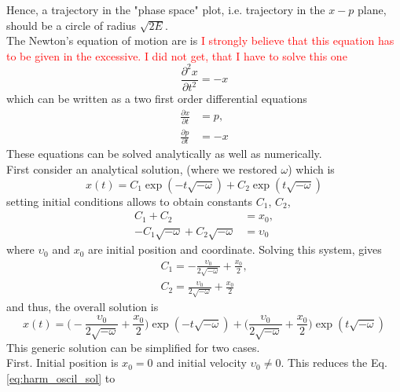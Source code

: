 \documentclass{article}
\begin{document}
Hence, a trajectory in the "phase space" plot, i.e. trajectory in the $x-p$ plane, should be a circle of radius $\sqrt{2E}$.\\
The Newton's equation of motion are is \textcolor{red}{I strongly believe that this equation has to be given in the excessive. I did not get, that I have to solve this one} 
\begin{equation}
	\frac{\partial^2 x}{\partial t^2} = -x
\end{equation}
which can be written as a two first order differential equations 
\begin{equation}
	\begin{aligned}
	\frac{\partial x}{\partial t} &= p, \\
	\frac{\partial p}{\partial t} &= -x
	\end{aligned}
\end{equation}
These equations can be solved analytically as well as numerically. \\
First consider an analytical solution, (where we restored $\omega$) which is 
\begin{equation}
	x(t) = C_1 \exp(-t\sqrt{-\omega}) + C_2 \exp(t\sqrt{-\omega})
\end{equation}
setting initial conditions allows to obtain constants $C_1$, $C_2$,
\begin{equation}
	\begin{aligned}
	C_1 + C_2 &= x_0, \\
	-C_1 \sqrt{-\omega} + C_2\sqrt{-\omega} &= \upsilon_0
	\end{aligned}
\end{equation}
where $\upsilon_0$ and $x_0$ are initial position and coordinate. Solving this system, gives
\begin{equation}
	\begin{aligned}
	C_1 = -\frac{\upsilon_0}{2\sqrt{-\omega}} + \frac{x_0}{2}, \\
	C_2= \frac{\upsilon_0}{2\sqrt{-\omega}} + \frac{x_0}{2}
	\end{aligned}
\end{equation}
and thus, the overall solution is 
\begin{equation}
	x(t) = \Big(-\frac{\upsilon_0}{2\sqrt{-\omega}}+\frac{x_0}{2}\Big)\exp(-t\sqrt{-\omega}) + \Big(\frac{\upsilon_0}{2\sqrt{-\omega}} + \frac{x_0}{2}\Big)\exp(t\sqrt{-\omega})
	\label{eq:harm_oscil_sol}
\end{equation}
This generic solution can be simplified for two cases. \\
First. Initial position is $x_0 = 0$ and initial velocity $\upsilon_0\neq 0$. This reduces the Eq. \ref{eq:harm_oscil_sol} to 
\end{document}
